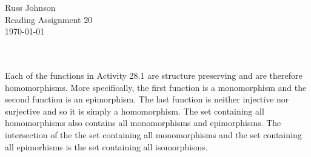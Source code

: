 \documentclass[11pt,a4paper]{article}
\begin{document}
\begin{flushright}
Russ Johnson\\
Reading Assignment 20\\
\today\\
\end{flushright}
~\\
~\\
Each of the functions in Activity 28.1 are structure preserving and are therefore homomorphisms. More specifically, the first function is a monomorphism and the second function is an epimorphism. The last function is neither injective nor surjective and so it is simply a homomorphism. The set containing all homomorphisms also contains all monomorphisms and epimorphisms. The intersection of the the set containing all monomorphisms and the set containing all epimorhisms is the set containing all isomorphisms.
\end{document}
